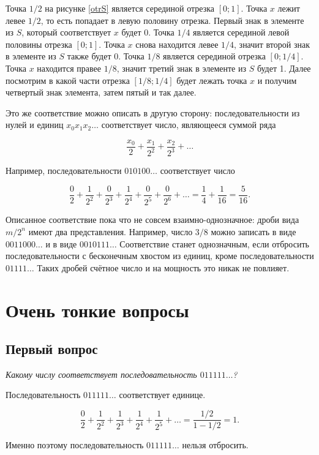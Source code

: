 \documentclass[12pt, a4paper]{article}
\begin{document}
Точка $1/2$ на рисунке \ref{otrS} является серединой отрезка $[0; 1]$. Точка $x$ лежит левее $1/2$, то есть попадает в левую половину отрезка. Первый знак в элементе из $S$, который соответствует $x$ будет 0. Точка $1/4$ является серединой левой  половины отрезка $[0;1]$. Точка $x$ снова находится левее $1/4$, значит второй знак в элементе из $S$ также будет 0. Точка $1/8$ является серединой отрезка $[0; 1/4]$. Точка $x$ находится правее $1/8$, значит третий знак в элементе из $S$ будет 1. Далее посмотрим в какой части отрезка $[1/8; 1/4]$ будет лежать точка $x$ и получим четвертый знак элемента, затем пятый и так далее.

Это же соответствие можно описать в другую сторону: последовательности из нулей и единиц $x_0 x_1 x_2 \dots$ соответствует число, являющееся суммой ряда

\[ \frac{x_0}{2}+\frac{x_1}{2^2}+\frac{x_2}{2^3}+\dots \]

Например, последовательности $010100 \dots$ соответствует число

\[\frac{0}{2}+\frac{1}{2^2}+\frac{0}{2^3}+\frac{1}{2^4}+\frac{0}{2^5}+\frac{0}{2^6}+ \dots =  \frac{1}{4}+\frac{1}{16}= \frac{5}{16}.\]

Описанное соответствие пока что не совсем взаимно-однозначное: дроби вида $m/2^n$ имеют два представления. Например, число $3/8$ можно записать в виде $0011000 \dots$ и в виде $0010111 \dots$ Соответствие станет однозначным, если отбросить последовательности с бесконечным хвостом из единиц, кроме последовательности $01111 \dots$ Таких дробей счётное число и на мощность это никак не повлияет.

\section{Очень тонкие вопросы} 

\subsection{Первый вопрос}

\textit{Какому числу соответствует последовательность $011111 \dots$?}

Последовательность $011111 \dots$ соответствует единице.

\[\frac{0}{2} + \frac{1}{2^2} + \frac{1}{2^3} + \frac{1}{2^4} + \frac{1}{2^5} + \ldots = \frac{1/2}{1-1/2} = 1.\]

Именно поэтому последовательность $011111 \dots$ нельзя отбросить.
\end{document}

